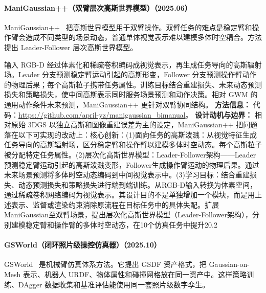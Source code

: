\paragraph{ManiGaussian++（双臂层次高斯世界模型）（2025.06）}
ManiGaussian++~\cite{2506_19842} 把高斯世界模型用于双臂操作。双臂任务的难点是稳定臂和操作臂会造成不同类型的场景动态，普通单体视觉表示难以建模多体时空耦合。方法提出 Leader-Follower 层次高斯世界模型。

输入 RGB-D 经过体素化和稀疏卷积编码成视觉表示，再生成任务导向的高斯辐射场。Leader 分支预测稳定臂运动引起的高斯形变，Follower 分支预测操作臂动作的物理后果；每个高斯粒子携带任务属性。训练目标结合重建损失、未来动态预测损失和策略损失，使中间高斯表示同时服务场景预测和动作决策。相对 GWM 的通用动作条件未来预测，ManiGaussian++ 更针对双臂协同结构。
\textbf{方法信息：} 代码：\url{https://github.com/april-yz/manigaussian_bimanual}。
\textbf{设计动机与边界：} 相对原始 3DGS 以独立高斯和图像重建误差为主的设定，ManiGaussian++ 把问题落在以下可实现的改动上：核心创新：(1)面向任务的高斯泼溅：从视觉特征生成任务导向的高斯辐射场，区分稳定臂和操作臂以建模多体时空动态。每个高斯粒子被分配特定任务属性。(2)层次化高斯世界模型：Leader-Follower架构——Leader预测稳定臂运动引起的高斯泼溅变形，Follower生成操作臂运动的物理后果。通过未来场景预测将多体时空动态编码到中间视觉表示中。(3)学习目标：结合重建损失、动态预测损失和策略损失进行端到端训练。从RGB-D输入转换为体素空间，通过稀疏卷积网络编码为视觉表示。其设计目的不是单独增加一个模块，而是用上述表示、监督或渲染约束消除原流程在目标任务中的具体失配。扩展ManiGaussian至双臂场景，提出层次化高斯世界模型（Leader-Follower架构），分别建模稳定臂和操作臂的多体时空动态，在10个仿真任务中提升20.2%
\paragraph{GSWorld（闭环照片级操控仿真器）（2025.10）}
GSWorld~\cite{2510_20813} 是机械臂仿真体系方法。它提出 GSDF 资产格式，把 Gaussian-on-Mesh 表示、机器人 URDF、物体属性和碰撞网格放在同一资产中。这样策略训练、DAgger 数据收集和基准评估能使用同一套照片级数字孪生。


